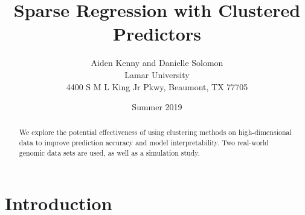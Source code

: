 \documentclass[11pt]{article}
\begin{document}

\title{Sparse Regression with Clustered Predictors}
\author{Aiden Kenny and Danielle Solomon\\
Lamar University\\
4400 S M L King Jr Pkwy, Beaumont, TX 77705}
\date{Summer 2019}
\maketitle


\begin{abstract}


We explore the potential effectiveness of using clustering methods on high-dimensional data to improve prediction accuracy and model interpretability. Two real-world genomic data sets are used, as well as a simulation study. 

\end{abstract}

\section{Introduction}



\end{document}
